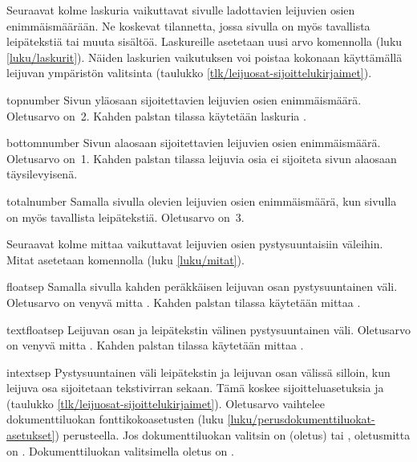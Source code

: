 Seuraavat kolme laskuria vaikuttavat sivulle ladottavien leijuvien osien
enimmäismäärään. Ne koskevat tilannetta, jossa sivulla on myös
tavallista leipätekstiä tai muuta sisältöä. Laskureille asetetaan uusi
arvo komennolla  (luku \ref{luku/laskurit}). Näiden
laskurien vaikutuksen voi poistaa kokonaan käyttämällä leijuvan
ympäristön valitsinta \koodi{!} (taulukko
\ref{tlk/leijuosat-sijoittelukirjaimet}).

\begin{maaritelma}{}
\item [topnumber] Sivun yläosaan sijoitettavien leijuvien osien
  enimmäismäärä. Oletusarvo on~2. Kahden palstan tilassa käytetään
  laskuria .
\item [bottomnumber] Sivun alaosaan sijoitettavien leijuvien osien
  enimmäismäärä. Oletusarvo on~1. Kahden palstan tilassa leijuvia osia
  ei sijoiteta sivun alaosaan täysilevyisenä.
\item [totalnumber] Samalla sivulla olevien leijuvien osien
  enimmäismäärä, kun sivulla on myös tavallista leipätekstiä. Oletusarvo
  on~3.
\end{maaritelma}

\noindent
Seuraavat kolme mittaa vaikuttavat leijuvien osien pystysuuntaisiin
väleihin. Mitat asetetaan komennolla  (luku
\ref{luku/mitat}).

\begin{maaritelma}{}
\item [floatsep] Samalla sivulla kahden peräkkäisen leijuvan osan
  pystysuuntainen väli. Oletusarvo on venyvä mitta . Kahden palstan tilassa käytetään mittaa
  .
\item [textfloatsep] Leijuvan osan ja leipätekstin välinen
  pystysuuntainen väli. Oletusarvo on venyvä mitta . Kahden palstan tilassa käytetään mittaa
  .
\item [intextsep] Pystysuuntainen väli leipätekstin ja leijuvan osan
  välissä silloin, kun leijuva osa sijoitetaan tekstivirran sekaan. Tämä
  koskee sijoitteluasetuksia  ja  (taulukko
  \ref{tlk/leijuosat-sijoittelukirjaimet}). Oletusarvo vaihtelee
  dokumenttiluokan fonttikokoasetusten (luku
  \ref{luku/perusdokumenttiluokat-asetukset}) perusteella. Jos
  dokumenttiluokan valitsin on \koodi{10pt} (oletus) tai \koodi{11pt},
  oletusmitta on . Dokumenttiluokan
  valitsimella \koodi{12pt} oletus on .
\end{maaritelma}

